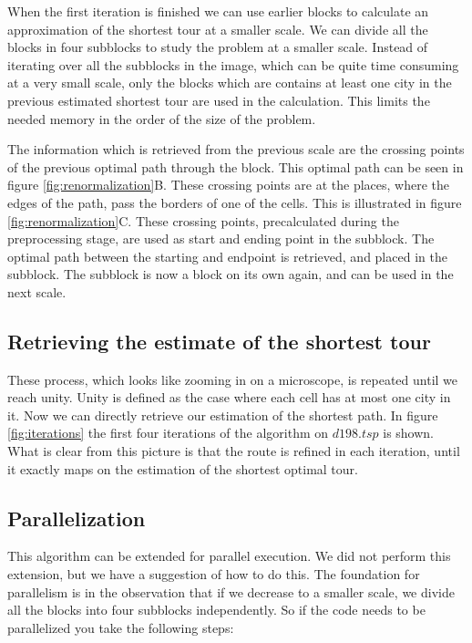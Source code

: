 When the first iteration is finished we can use earlier blocks to calculate an approximation of the shortest tour at a smaller scale. We can divide all the blocks in four subblocks to study the problem at a smaller scale. Instead of iterating over all the subblocks in the image, which can be quite time consuming at a very small scale, only the blocks which are contains at least one city in the previous estimated shortest tour are used in the calculation. This limits the needed memory in the order of the size of the problem.

The information which is retrieved from the previous scale are the crossing points of the previous optimal path through the block. This optimal path can be seen in figure \ref{fig:renormalization}B.  These crossing points are at the places, where the edges of the path, pass the borders of one of the cells. This is illustrated in figure \ref{fig:renormalization}C. These crossing points, precalculated during the preprocessing stage, are used as start and ending point in the subblock. The optimal path between the starting and endpoint is retrieved, and placed in the subblock. The subblock is now a block on its own again, and can be used in the next scale.

\subsection{Retrieving the estimate of the shortest tour}
These process, which looks like zooming in on a microscope, is repeated until we reach unity. Unity is defined as the case where each cell has at most one city in it. Now we can directly retrieve our estimation of the shortest path. In figure \ref{fig:iterations} the first four iterations of the algorithm on $d198.tsp$ is shown. What is clear from this picture is that the route is refined in each iteration, until it exactly maps on the estimation  of the shortest optimal tour.

\subsection{Parallelization}
This algorithm can be extended for parallel execution. We did not perform this extension, but we have a suggestion of how to do this. The foundation for parallelism is in the observation that if we decrease to a smaller scale, we divide all the blocks into four subblocks independently. So if the code needs to be parallelized you take the following steps:

